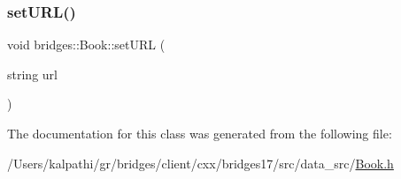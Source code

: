\mbox{\label{classbridges_1_1_book_a4a96a6bd3956056b450c9df13e976a5a}} 
\subsubsection{\texorpdfstring{set\+U\+R\+L()}{setURL()}}
{\footnotesize\ttfamily void bridges\+::\+Book\+::set\+U\+RL (\begin{DoxyParamCaption}\item[{string}]{url }\end{DoxyParamCaption})\hspace{0.3cm}{\ttfamily [inline]}}



The documentation for this class was generated from the following file\+:\begin{DoxyCompactItemize}
\item 
/\+Users/kalpathi/gr/bridges/client/cxx/bridges17/src/data\+\_\+src/\mbox{\hyperlink{_book_8h}{Book.\+h}}\end{DoxyCompactItemize}
